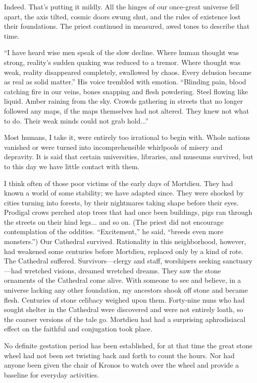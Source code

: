 Indeed. That's putting it mildly. All the hinges of our once-great universe fell apart, the axis tilted, cosmic doors swung shut, and the rules of existence lost their foundations. The priest continued in measured, awed tones to describe that time.

``I have heard wise men speak of the slow decline. Where human thought was strong, reality's sudden quaking was reduced to a tremor. Where thought was weak, reality disappeared completely, swallowed by chaos. Every delusion became as real as solid matter.'' His voice trembled with emotion. ``Blinding pain, blood catching fire in our veins, bones snapping and flesh powdering. Steel flowing like liquid. Amber raining from the sky. Crowds gathering in streets that no longer followed any maps, if the maps themselves had not altered. They knew not what to do. Their weak minds could not grab hold...''

Most humans, I take it, were entirely too irrational to begin with. Whole nations vanished or were turned into incomprehensible whirlpools of misery and depravity. It is said that certain universities, libraries, and museums survived, but to this day we have little contact with them.

I think often of those poor victims of the early days of Mortdieu. They had known a world of some stability; we have adapted since. They were shocked by cities turning into forests, by their nightmares taking shape before their eyes. Prodigal crows perched atop trees that had once been buildings, pigs ran through the streets on their hind legs... and so on. (The priest did not encourage contemplation of the oddities. ``Excitement,'' he said, ``breeds even more monsters.'') Our Cathedral survived. Rationality in this neighborhood, however, had weakened some centuries before Mortdieu, replaced only by a kind of rote. The Cathedral suffered. Survivors—clergy and staff, worshipers seeking sanctuary—had wretched visions, dreamed wretched dreams. They saw the stone ornaments of the Cathedral come alive. With someone to see and believe, in a universe lacking any other foundation, my ancestors shook off stone and became flesh. Centuries of stone celibacy weighed upon them. Forty-nine nuns who had sought shelter in the Cathedral were discovered and were not entirely loath, so the coarser versions of the tale go. Mortdieu had had a surprising aphrodisiacal effect on the faithful and conjugation took place.

No definite gestation period has been established, for at that time the great stone wheel had not been set twisting back and forth to count the hours. Nor had anyone been given the chair of Kronos to watch over the wheel and provide a baseline for everyday activities.

